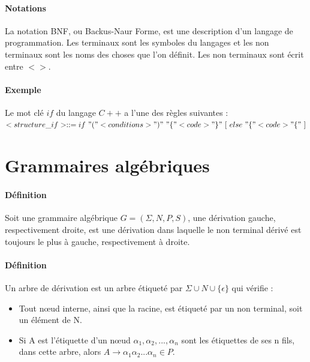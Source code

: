 

\paragraph{Notations} %
\label{par:notations}

La notation BNF, ou Backus-Naur Forme, est une description d'un langage de programmation. Les terminaux sont les symboles du langages et les non terminaux sont les noms des choses que l'on définit. Les non terminaux sont écrit entre $<>$.



\paragraph{Exemple} %
\label{par:exemple}

Le mot clé $if$ du langage $C++$ a l'une des règles suivantes :\\
$<structure\_if> ::= if\ "(" <conditions> ")"\ "\{" <code> "\}"\ [\ else\ "\{" <code> "\{"\ ]$





\section{Grammaires algébriques} %
\label{sec:grammaires_alg_briques}


\paragraph{Définition} %
\label{par:d_finition}

Soit une grammaire algébrique $G=(\Sigma, N, P, S)$, une dérivation gauche, respectivement droite, est une dérivation dans laquelle le non terminal dérivé est toujours le plus à gauche, respectivement à droite.



\paragraph{Définition} %
\label{par:d_finition}

Un arbre de dérivation est un arbre étiqueté par $\Sigma \cup N \cup \{\epsilon\}$ qui vérifie :

\begin{itemize}
	\item Tout nœud interne, ainsi que la racine, est étiqueté par un non terminal, soit un élément de N.
	\item Si A est l'étiquette d'un nœud $\alpha_1, \alpha_2, ..., \alpha_n$ sont les étiquettes de ses n fils, dans cette arbre, alors $A \rightarrow \alpha_1\alpha_2...\alpha_n \in P$.
\end{itemize}

